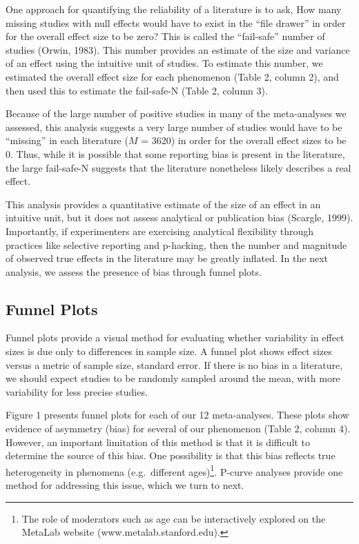 \documentclass[english,floatsintext,man]{apa6}
\begin{document}
One approach for quantifying the reliability of a literature is to ask,
How many missing studies with null effects would have to exist in the
\enquote{file drawer} in order for the overall effect size to be zero?
This is called the \enquote{fail-safe} number of studies (Orwin, 1983).
This number provides an estimate of the size and variance of an effect
using the intuitive unit of studies. To estimate this number, we
estimated the overall effect size for each phenomenon (Table 2, column
2), and then used this to estimate the fail-safe-N (Table 2, column 3).

Because of the large number of positive studies in many of the
meta-analyses we assessed, this analysis suggests a very large number of
studies would have to be \enquote{missing} in each literature (\(M\) =
3620) in order for the overall effect sizes to be 0. Thus, while it is
possible that some reporting bias is present in the literature, the
large fail-safe-N suggests that the literature nonetheless likely
describes a real effect.

This analysis provides a quantitative estimate of the size of an effect
in an intuitive unit, but it does not assess analytical or publication
bias (Scargle, 1999). Importantly, if experimenters are exercising
analytical flexibility through practices like selective reporting and
p-hacking, then the number and magnitude of observed true effects in the
literature may be greatly inflated. In the next analysis, we assess the
presence of bias through funnel plots.

\subsection{Funnel Plots}\label{funnel-plots}

Funnel plots provide a visual method for evaluating whether variability
in effect sizes is due only to differences in sample size. A funnel plot
shows effect sizes versus a metric of sample size, standard error. If
there is no bias in a literature, we should expect studies to be
randomly sampled around the mean, with more variability for less precise
studies.

Figure 1 presents funnel plots for each of our 12 meta-analyses. These
plots show evidence of asymmetry (bias) for several of our phenomenon
(Table 2, column 4). However, an important limitation of this method is
that it is difficult to determine the source of this bias. One
possibility is that this bias reflects true heterogeneity in phenomena
(e.g.~different
ages)\footnote{The role of moderators such as age can be interactively explored on the MetaLab website (www.metalab.stanford.edu).}.
P-curve analyses provide one method for addressing this issue, which we
turn to next.
\end{document}

